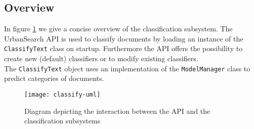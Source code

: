 \subsection{Overview}
In figure \ref{fig:classify-uml} we give a concise overview of the classification subsystem. The UrbanSearch API is used to classify documents by loading an instance of the \texttt{ClassifyText} class on startup. Furthermore the API offers the possibility to create new (default) classifiers or to modify existing classifiers.\\
The \texttt{ClassifyText} object uses an implementation of the \texttt{ModelManager} class to predict categories of documents.
\begin{figure}[H]
\centering
\texttt{[image: classify-uml]}
\caption{Diagram depicting the interaction between the API and the classification subsystems}
\label{fig:classify-uml}
\end{figure}
